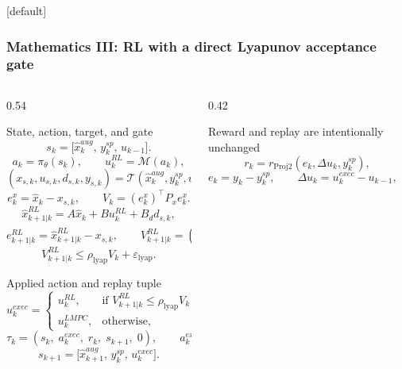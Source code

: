 \documentclass[aspectratio=169]{beamer}
\begin{document}
\begin{frame}
[default]
\frametitle{\large \textbf{Mathematics III: RL with a direct Lyapunov acceptance gate}}
\tiny
\vspace{-0.30cm}

\begin{columns}[T,onlytextwidth]

\begin{column}{0.54\textwidth}
\begin{block}{State, action, target, and gate}
\justifying
\[
s_k=\big[\hat x_k^{aug},\, y_k^{sp},\, u_{k-1}\big].
\]
\[
a_k=\pi_\theta(s_k),\qquad u_k^{RL}=\mathcal{M}(a_k),
\]
\[
(x_{s,k},u_{s,k},d_{s,k},y_{s,k})=\mathcal{T}(\hat x_k^{aug},y_k^{sp},u_{k-1}).
\]
\[
e_k^x=\hat x_k-x_{s,k},\qquad
V_k=(e_k^x)^\top P_x e_k^x .
\]
\[
\hat x_{k+1|k}^{RL}=A\hat x_k+B u_k^{RL}+B_d d_{s,k},
\]
\[
e_{k+1|k}^{RL}=\hat x_{k+1|k}^{RL}-x_{s,k},
\qquad
V_{k+1|k}^{RL}=(e_{k+1|k}^{RL})^\top P_x e_{k+1|k}^{RL},
\]
\[
V_{k+1|k}^{RL}\le \rho_{\mathrm{lyap}}V_k+\varepsilon_{\mathrm{lyap}}.
\]
\end{block}

\vspace{0.02cm}

\begin{block}{Applied action and replay tuple}
\justifying
\[
u_k^{exec}=
\begin{cases}
u_k^{RL}, & \text{if } V_{k+1|k}^{RL}\le \rho_{\mathrm{lyap}}V_k+\varepsilon_{\mathrm{lyap}},\\
u_k^{LMPC}, & \text{otherwise},
\end{cases}
\]
\[
\tau_k=(s_k,\; a_k^{exec},\; r_k,\; s_{k+1},\; 0),\qquad
a_k^{exec}=\mathcal{M}^{-1}(u_k^{exec}).
\]
\[
s_{k+1}=\big[\hat x_{k+1}^{aug},\, y_k^{sp},\, u_k^{exec}\big].
\]
\end{block}
\end{column}

\begin{column}{0.42\textwidth}
\begin{block}{Reward and replay are intentionally unchanged}
\justifying
\[
r_k=r_{\mathrm{Proj2}}(e_k,\Delta u_k,y_k^{sp}),
\]
\[
e_k=y_k-y_k^{sp},\qquad
\Delta u_k=u_k^{exec}-u_{k-1},\qquad
\mathcal{B}_{k+1}=\mathcal{B}_k\cup\{\tau_k\}.
\]
\end{block}

\vspace{0.02cm}


\end{column}
\end{columns}
\end{frame}
\end{document}
